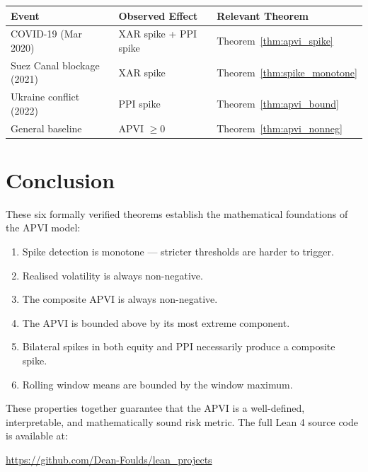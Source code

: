 \documentclass[12pt, a4paper]{article}
\theoremstyle{definition}
\begin{document}
\begin{center}
\begin{tabular}{lll}
\toprule
\textbf{Event} & \textbf{Observed Effect} & \textbf{Relevant Theorem} \\
\midrule
COVID-19 (Mar 2020)        & XAR spike + PPI spike    & Theorem~\ref{thm:apvi_spike} \\
Suez Canal blockage (2021) & XAR spike                & Theorem~\ref{thm:spike_monotone} \\
Ukraine conflict (2022)    & PPI spike                & Theorem~\ref{thm:apvi_bound} \\
General baseline           & APVI $\geq 0$            & Theorem~\ref{thm:apvi_nonneg} \\
\bottomrule
\end{tabular}
\end{center}

\section{Conclusion}

These six formally verified theorems establish the mathematical
foundations of the APVI model:

\begin{enumerate}
    \item Spike detection is monotone — stricter thresholds are harder to trigger.
    \item Realised volatility is always non-negative.
    \item The composite APVI is always non-negative.
    \item The APVI is bounded above by its most extreme component.
    \item Bilateral spikes in both equity and PPI necessarily produce a composite spike.
    \item Rolling window means are bounded by the window maximum.
\end{enumerate}

These properties together guarantee that the APVI is a well-defined,
interpretable, and mathematically sound risk metric. The full Lean 4
source code is available at:
\begin{center}
\url{https://github.com/Dean-Foulds/lean_projects}
\end{center}
\end{document}
